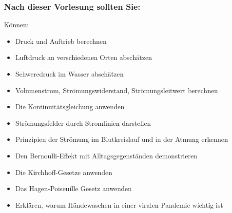 \documentclass{beamer}
\begin{document}
\begin{frame}

\frametitle{Nach dieser Vorlesung sollten Sie:}
 



\begin{block}{Können:}
\begin{itemize}
\item
Druck und Auftrieb berechnen
\item
Luftdruck an verschiedenen Orten abschätzen
\item
Schweredruck im Wasser abschätzen
\item
Volumenstrom, Strömungswiderstand, Strömungsleitwert berechnen
\item
Die Kontinuitätsgleichung anwenden
\item
Strömungsfelder durch Stromlinien darstellen
\item
Prinzipien der Strömung im Blutkreislauf und in der Atmung erkennen
\item
Den Bernoulli-Effekt mit Alltagsgegenständen demonstrieren
\item
Die Kirchhoff-Gesetze anwenden
\item
Das Hagen-Poiseuille Gesetz anwenden
\item
Erklären, warum Händewaschen in einer viralen Pandemie wichtig ist
\end{itemize}
\end{block}

\end{frame}
\end{document}
